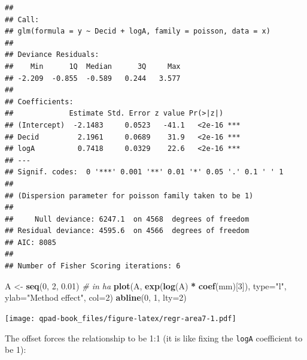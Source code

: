 \documentclass[12pt,]{book}
\newenvironment{Shaded}{\begin{snugshade}}{\end{snugshade}}
\newcommand{\CommentTok}[1]{\textcolor[rgb]{0.56,0.35,0.01}{\textit{#1}}}
\newcommand{\DataTypeTok}[1]{\textcolor[rgb]{0.13,0.29,0.53}{#1}}
\newcommand{\DecValTok}[1]{\textcolor[rgb]{0.00,0.00,0.81}{#1}}
\newcommand{\FloatTok}[1]{\textcolor[rgb]{0.00,0.00,0.81}{#1}}
\newcommand{\KeywordTok}[1]{\textcolor[rgb]{0.13,0.29,0.53}{\textbf{#1}}}
\newcommand{\NormalTok}[1]{#1}
\newcommand{\OperatorTok}[1]{\textcolor[rgb]{0.81,0.36,0.00}{\textbf{#1}}}
\newcommand{\StringTok}[1]{\textcolor[rgb]{0.31,0.60,0.02}{#1}}
\begin{document}
\begin{verbatim}
## 
## Call:
## glm(formula = y ~ Decid + logA, family = poisson, data = x)
## 
## Deviance Residuals: 
##    Min      1Q  Median      3Q     Max  
## -2.209  -0.855  -0.589   0.244   3.577  
## 
## Coefficients:
##             Estimate Std. Error z value Pr(>|z|)    
## (Intercept)  -2.1483     0.0523   -41.1   <2e-16 ***
## Decid         2.1961     0.0689    31.9   <2e-16 ***
## logA          0.7418     0.0329    22.6   <2e-16 ***
## ---
## Signif. codes:  0 '***' 0.001 '**' 0.01 '*' 0.05 '.' 0.1 ' ' 1
## 
## (Dispersion parameter for poisson family taken to be 1)
## 
##     Null deviance: 6247.1  on 4568  degrees of freedom
## Residual deviance: 4595.6  on 4566  degrees of freedom
## AIC: 8085
## 
## Number of Fisher Scoring iterations: 6
\end{verbatim}

\begin{Shaded}
\begin{Highlighting}[]
\NormalTok{A <-}\StringTok{ }\KeywordTok{seq}\NormalTok{(}\DecValTok{0}\NormalTok{, }\DecValTok{2}\NormalTok{, }\FloatTok{0.01}\NormalTok{) }\CommentTok{# in ha}
\KeywordTok{plot}\NormalTok{(A, }\KeywordTok{exp}\NormalTok{(}\KeywordTok{log}\NormalTok{(A) }\OperatorTok{*}\StringTok{ }\KeywordTok{coef}\NormalTok{(mm)[}\DecValTok{3}\NormalTok{]), }\DataTypeTok{type=}\StringTok{"l"}\NormalTok{,}
  \DataTypeTok{ylab=}\StringTok{"Method effect"}\NormalTok{, }\DataTypeTok{col=}\DecValTok{2}\NormalTok{)}
\KeywordTok{abline}\NormalTok{(}\DecValTok{0}\NormalTok{, }\DecValTok{1}\NormalTok{, }\DataTypeTok{lty=}\DecValTok{2}\NormalTok{)}
\end{Highlighting}
\end{Shaded}

\texttt{[image: qpad-book\_files/figure-latex/regr-area7-1.pdf]}

The offset forces the relationship to be 1:1
(it is like fixing the \texttt{logA} coefficient to be 1):

\begin{Shaded}
\end{Shaded}
\end{document}
